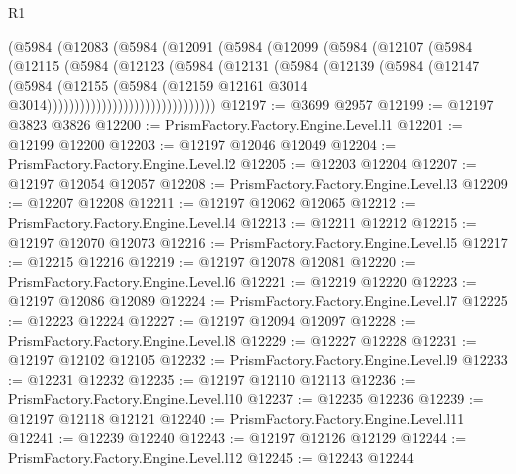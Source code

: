 \begin{lexlean}{R1}
\begin{coremodule}
                      (@5984
                        (@12083
                          (@5984
                            (@12091
                              (@5984
                                (@12099
                                  (@5984
                                    (@12107
                                      (@5984
                                        (@12115
                                          (@5984
                                            (@12123
                                              (@5984
                                                (@12131
                                                  (@5984
                                                    (@12139
                                                      (@5984
                                                        (@12147
                                                          (@5984
                                                            (@12155
                                                              (@5984
                                                                (@12159
                                                                  @12161
                                                                  @3014
                                                                  @3014)))))))))))))))))))))))))))))))
@12197 := @3699 @2957
@12199 := @12197 @3823 @3826
@12200 := PrismFactory.Factory.Engine.Level.l1
@12201 := @12199 @12200
@12203 := @12197 @12046 @12049
@12204 := PrismFactory.Factory.Engine.Level.l2
@12205 := @12203 @12204
@12207 := @12197 @12054 @12057
@12208 := PrismFactory.Factory.Engine.Level.l3
@12209 := @12207 @12208
@12211 := @12197 @12062 @12065
@12212 := PrismFactory.Factory.Engine.Level.l4
@12213 := @12211 @12212
@12215 := @12197 @12070 @12073
@12216 := PrismFactory.Factory.Engine.Level.l5
@12217 := @12215 @12216
@12219 := @12197 @12078 @12081
@12220 := PrismFactory.Factory.Engine.Level.l6
@12221 := @12219 @12220
@12223 := @12197 @12086 @12089
@12224 := PrismFactory.Factory.Engine.Level.l7
@12225 := @12223 @12224
@12227 := @12197 @12094 @12097
@12228 := PrismFactory.Factory.Engine.Level.l8
@12229 := @12227 @12228
@12231 := @12197 @12102 @12105
@12232 := PrismFactory.Factory.Engine.Level.l9
@12233 := @12231 @12232
@12235 := @12197 @12110 @12113
@12236 := PrismFactory.Factory.Engine.Level.l10
@12237 := @12235 @12236
@12239 := @12197 @12118 @12121
@12240 := PrismFactory.Factory.Engine.Level.l11
@12241 := @12239 @12240
@12243 := @12197 @12126 @12129
@12244 := PrismFactory.Factory.Engine.Level.l12
@12245 := @12243 @12244

\end{coremodule}
\end{lexlean}
